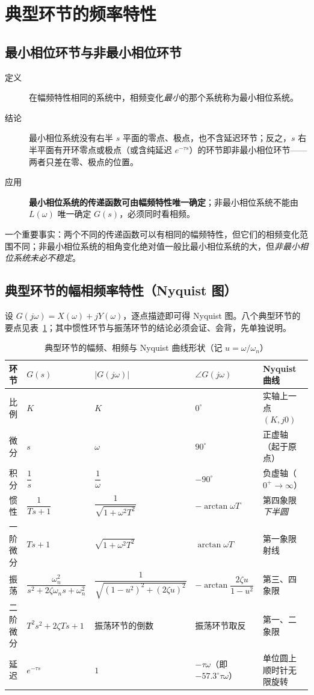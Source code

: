 \bigskip

\section{典型环节的频率特性}

\subsection{最小相位环节与非最小相位环节}
\begin{description}
    \item[定义] 在幅频特性相同的系统中，相频变化\emph{最小}的那个系统称为最小相位系统。
    \item[结论] 最小相位系统没有右半 $s$ 平面的零点、极点，也不含延迟环节；反之，$s$ 右半平面有开环零点或极点（或含纯延迟 $e^{-\tau s}$）的环节即非最小相位环节——两者只差在零、极点的位置。
    \item[应用] \textbf{最小相位系统的传递函数可由幅频特性唯一确定}；非最小相位系统不能由 $L(\omega)$ 唯一确定 $G(s)$，必须同时看相频。
\end{description}
一个重要事实：两个不同的传递函数可以有相同的幅频特性，但它们的相频变化范围不同；非最小相位系统的相角变化绝对值一般比最小相位系统的大，但\emph{非最小相位系统未必不稳定}。

\subsection{典型环节的幅相频率特性（Nyquist 图）}
设 $G(j\omega)=X(\omega)+jY(\omega)$，逐点描迹即可得 Nyquist 图。八个典型环节的要点见表~\ref{tab:nyqlink}；其中惯性环节与振荡环节的结论必须会证、会背，先单独说明。

\begin{table}[htbp]
\centering
\small
\caption{典型环节的幅频、相频与 Nyquist 曲线形状（记 $u=\omega/\omega_n$）}\label{tab:nyqlink}
\begin{tabular}{lp{2.4cm}p{3.3cm}p{2.5cm}p{3.1cm}}
\toprule
环节 & $G(s)$ & $|G(j\omega)|$ & $\angle G(j\omega)$ & Nyquist 曲线 \\
\midrule
比例 & $K$ & $K$ & $0^\circ$ & 实轴上一点 $(K,j0)$ \\
微分 & $s$ & $\omega$ & $90^\circ$ & 正虚轴（起于原点） \\
积分 & $\dfrac{1}{s}$ & $\dfrac{1}{\omega}$ & $-90^\circ$ & 负虚轴（$0^+\to\infty$） \\
惯性 & $\dfrac{1}{Ts+1}$ & $\dfrac{1}{\sqrt{1+\omega^2T^2}}$ & $-\arctan\omega T$ & 第四象限\emph{下半圆} \\
一阶微分 & $Ts+1$ & $\sqrt{1+\omega^2T^2}$ & $\arctan\omega T$ & 第一象限射线 \\
振荡 & $\dfrac{\omega_n^2}{s^2+2\zeta\omega_ns+\omega_n^2}$ & $\dfrac{1}{\sqrt{(1-u^2)^2+(2\zeta u)^2}}$ & $-\arctan\dfrac{2\zeta u}{1-u^2}$ & 第三、四象限 \\
二阶微分 & $T^2s^2+2\zeta Ts+1$ & 振荡环节的倒数 & 振荡环节取反 & 第一、二象限 \\
延迟 & $e^{-\tau s}$ & $1$ & $-\tau\omega$（即 $-57.3^\circ\tau\omega$） & 单位圆上顺时针无限旋转 \\
\bottomrule
\end{tabular}
\end{table}

